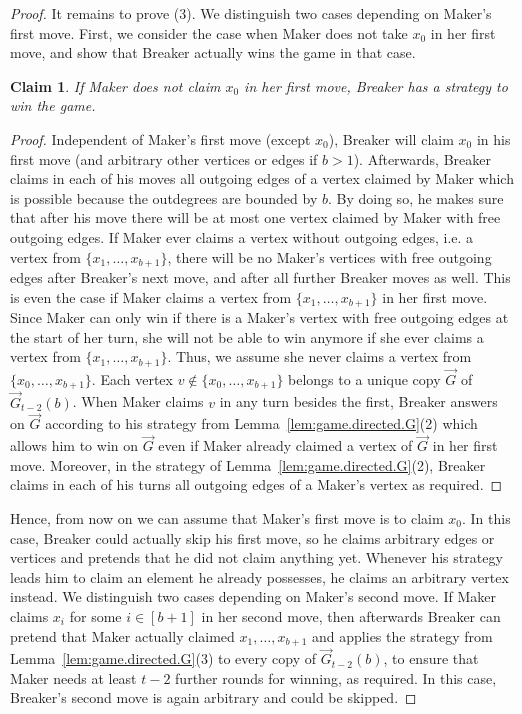 \documentclass[reqno, 12pt]{amsart}
\numberwithin{equation}{section}
\numberwithin{figure}{section}
\newtheorem{claim}[theorem]{Claim}
\begin{document}
\begin{proof}
It remains to prove (3). We distinguish two cases depending on Maker's first move. First, we consider the case when Maker does not take $x_0$ in her first move, and show that Breaker actually wins the game in that case.
\begin{claim}
    If Maker does not claim $x_0$ in her first move, Breaker has a strategy to win the game.
\end{claim}
\begin{proof}
    Independent of Maker's first move (except $x_0$), Breaker will claim $x_0$ in his first move (and arbitrary other vertices or edges if $b > 1$). Afterwards, Breaker claims in each of his moves all outgoing edges of a vertex claimed by Maker which is possible because the outdegrees are bounded by $b$. By doing so, he makes sure that after his move there will be at most one vertex claimed by Maker with free outgoing edges. If Maker ever claims a vertex without outgoing edges, i.e. a vertex from $\{x_1,\ldots,x_{b+1}\}$, there will be no Maker's vertices with free outgoing edges after Breaker's next move, and after all further Breaker moves as well. This is even the case if Maker claims a vertex from $\{x_1,\ldots,x_{b+1}\}$ in her first move. Since Maker can only win if there is a Maker's vertex with free outgoing edges at the start of her turn, she will not be able to win anymore if she ever claims a vertex from $\{x_1,\ldots,x_{b+1}\}$.
    Thus, we assume she never claims a vertex from $\{x_0,\ldots,x_{b+1}\}$. Each vertex $v \notin \{x_0,\ldots,x_{b+1}\}$ belongs to a unique copy $\vec{G}$ of $\vec{G}_{t-2}(b)$. When Maker claims $v$ in any turn besides the first, Breaker answers on $\vec{G}$ according to his strategy from Lemma~\ref{lem:game.directed.G}(2) which allows him to win on $\vec{G}$ even if Maker already claimed a vertex of $\vec{G}$ in her first move. Moreover, in the strategy of Lemma~\ref{lem:game.directed.G}(2), Breaker claims in each of his turns all outgoing edges of a Maker's vertex as required.
\end{proof}
Hence, from now on we can assume that Maker's first move is to claim $x_0$. In this case, Breaker could actually skip his first move, so he claims arbitrary edges or vertices and pretends that he did not claim anything yet. Whenever his strategy leads him to claim an element he already possesses, he claims an arbitrary vertex instead.
We distinguish two cases depending on Maker's second move.
If Maker claims $x_i$ for some $i \in [b+1]$ in her second move, then afterwards Breaker can pretend that Maker actually claimed $x_1,\ldots,x_{b+1}$ and applies the strategy from Lemma~\ref{lem:game.directed.G}(3) to every copy of $\vec{G}_{t-2}(b)$, to ensure that Maker needs at least $t-2$ further rounds for winning, as required. In this case, Breaker's second move is again arbitrary and could be skipped.

\end{proof}
\end{document}

